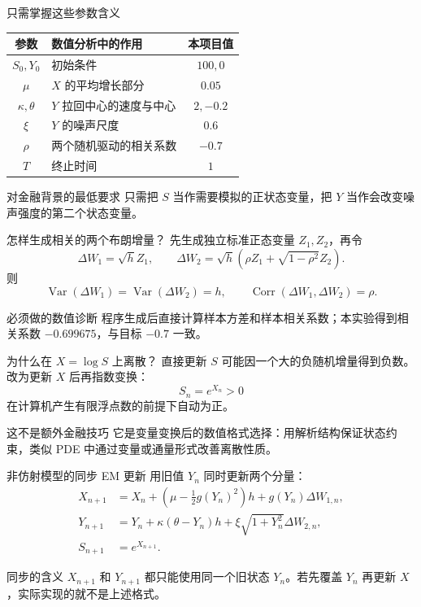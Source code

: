 \documentclass[aspectratio=169,10pt,fontset=none]{ctexbeamer}
\newcommand{\Var}{\operatorname{Var}}
\begin{document}
\begin{frame}{只需掌握这些参数含义}
  \begin{center}
    \begin{tabular}{clc}
      \toprule
      参数 & 数值分析中的作用 & 本项目值 \\
      \midrule
      $S_0,Y_0$ & 初始条件 & $100,0$ \\
      $\mu$ & $X$ 的平均增长部分 & $0.05$ \\
      $\kappa,\theta$ & $Y$ 拉回中心的速度与中心 & $2,-0.2$ \\
      $\xi$ & $Y$ 的噪声尺度 & $0.6$ \\
      $\rho$ & 两个随机驱动的相关系数 & $-0.7$ \\
      $T$ & 终止时间 & $1$ \\
      \bottomrule
    \end{tabular}
  \end{center}
  \begin{block}{对金融背景的最低要求}
    只需把 $S$ 当作需要模拟的正状态变量，把 $Y$ 当作会改变噪声强度的第二个状态变量。
  \end{block}
\end{frame}

\begin{frame}{怎样生成相关的两个布朗增量？}
  先生成独立标准正态变量 $Z_1,Z_2$，再令
  \[
    \Delta W_1=\sqrt h Z_1,
    \qquad
    \Delta W_2=\sqrt h\left(\rho Z_1+\sqrt{1-\rho^2}Z_2\right).
  \]
  则
  \[
    \Var(\Delta W_1)=\Var(\Delta W_2)=h,
    \qquad
    \operatorname{Corr}(\Delta W_1,\Delta W_2)=\rho.
  \]
  \begin{alertblock}{必须做的数值诊断}
    程序生成后直接计算样本方差和样本相关系数；本实验得到相关系数 $-0.699675$，与目标 $-0.7$ 一致。
  \end{alertblock}
\end{frame}

\begin{frame}{为什么在 $X=\log S$ 上离散？}
  直接更新 $S$ 可能因一个大的负随机增量得到负数。改为更新 $X$ 后再指数变换：
  \[
    S_n=e^{X_n}>0
  \]
  在计算机产生有限浮点数的前提下自动为正。
  \begin{block}{这不是额外金融技巧}
    它是变量变换后的数值格式选择：用解析结构保证状态约束，类似 PDE 中通过变量或通量形式改善离散性质。
  \end{block}
\end{frame}

\begin{frame}{非仿射模型的同步 EM 更新}
  用旧值 $Y_n$ 同时更新两个分量：
  \begin{align*}
    X_{n+1}&=X_n+\left(\mu-\frac12g(Y_n)^2\right)h
      +g(Y_n)\Delta W_{1,n},\\
    Y_{n+1}&=Y_n+\kappa(\theta-Y_n)h
      +\xi\sqrt{1+Y_n^2}\Delta W_{2,n},\\
    S_{n+1}&=e^{X_{n+1}}.
  \end{align*}
  \begin{alertblock}{同步的含义}
    $X_{n+1}$ 和 $Y_{n+1}$ 都只能使用同一个旧状态 $Y_n$。若先覆盖 $Y_n$ 再更新 $X$，实际实现的就不是上述格式。
  \end{alertblock}
\end{frame}
\end{document}
